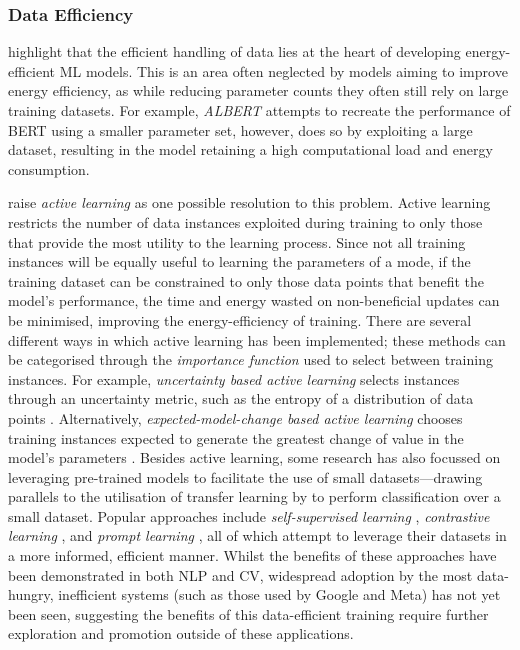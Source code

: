 \documentclass[a4paper, 12pt]{article}
\begin{document}
    \subsubsection{Data Efficiency}

     highlight that the efficient handling of data lies at the heart of developing energy-efficient ML models. This is an area often neglected by models aiming to improve energy efficiency, as while reducing parameter counts they often still rely on large training datasets. For example, \emph{ALBERT} \cite{lan-2020} attempts to recreate the performance of BERT using a smaller parameter set, however, does so by exploiting a large dataset, resulting in the model retaining a high computational load and energy consumption. 

     raise \emph{active learning} as one possible resolution to this problem. Active learning restricts the number of data instances exploited during training to only those that provide the most utility to the learning process. Since not all training instances will be equally useful to learning the parameters of a mode, if the training dataset can be constrained to only those data points that benefit the model's performance, the time and energy wasted on non-beneficial updates can be minimised, improving the energy-efficiency of training. There are several different ways in which active learning has been implemented; these methods can be categorised through the \emph{importance function} used to select between training instances. For example, \emph{uncertainty based active learning} selects instances through an uncertainty metric, such as the entropy of a distribution of data points \cite{joshi-2009}. Alternatively, \emph{expected-model-change based active learning} chooses training instances expected to generate the greatest change of value in the model's parameters \cite{freytag-2014}. Besides active learning, some research has also focussed on leveraging pre-trained models to facilitate the use of small datasets---drawing parallels to the utilisation of transfer learning by  to perform classification over a small dataset. Popular approaches include \emph{self-supervised learning} \cite{jing-2019}, \emph{contrastive learning} \cite{chen-2020} , and \emph{prompt learning} \cite{liu-2021b}, all of which attempt to leverage their datasets in a more informed, efficient manner. Whilst the benefits of these approaches have been demonstrated in both NLP and CV, widespread adoption by the most data-hungry, inefficient systems (such as those used by Google and Meta) has not yet been seen, suggesting the benefits of this data-efficient training require further exploration and promotion outside of these applications.
\end{document}
